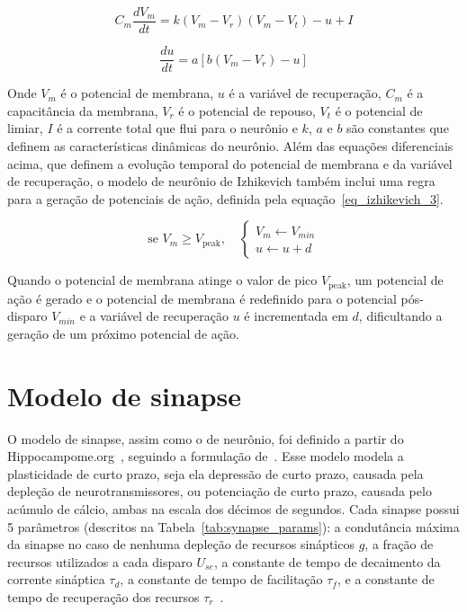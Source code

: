 
\begin{equation}
\label{eq_izhikevich_1}
C_m \frac{dV_m}{dt} = k (V_m - V_r)(V_m - V_t) - u + I
\end{equation}

\begin{equation}
\label{eq_izhikevich_2}
\frac{du}{dt} = a [b(V_m-V_r) - u]
\end{equation}

Onde $V_m$ é o potencial de membrana, $u$ é a variável de recuperação, $C_m$ é a capacitância da membrana, $V_r$ é o
potencial de repouso, $V_t$ é o potencial de limiar, $I$ é a corrente total que flui para o neurônio e $k$, $a$ e $b$ são
constantes que definem as características dinâmicas do neurônio. Além das equações diferenciais acima, que definem a evolução
temporal do potencial de membrana e da variável de recuperação, o modelo de neurônio de Izhikevich também inclui uma regra para
a geração de potenciais de ação, definida pela equação~\ref{eq_izhikevich_3}.

\begin{equation}
\label{eq_izhikevich_3}
\text{se } V_m \geq V_{\text{peak}}, \quad
\begin{cases}
V_m \gets V_{min} \\
u \gets u + d
\end{cases}
\end{equation}

Quando o potencial de membrana atinge o valor de pico $V_{\text{peak}}$, um potencial de ação é gerado e o potencial de membrana é
redefinido para o potencial pós-disparo $V_{min}$ e a variável de recuperação $u$ é incrementada em $d$, dificultando a geração de
um próximo potencial de ação.



\section{Modelo de sinapse}

O modelo de sinapse, assim como o de neurônio, foi definido a partir do Hippocampome.org~\cite{wheelerHippocampomeorg2023},
seguindo a formulação de~. Esse modelo modela a
plasticidade de curto prazo, seja ela depressão de curto prazo, causada pela depleção de neurotransmissores, ou potenciação de
curto prazo, causada pelo acúmulo de cálcio, ambas na escala dos décimos de segundos. Cada sinapse possui 5 parâmetros (descritos
na Tabela~\ref{tab:synapse_params}): a condutância máxima da sinapse no caso de nenhuma depleção de recursos sinápticos $g$, a fração de
recursos utilizados a cada disparo $U_{se}$, a constante de tempo de decaimento da corrente sináptica $\tau_d$,
a constante de tempo de facilitação $\tau_f$, e a constante de tempo de recuperação dos recursos $\tau_r$~\cite{moradiNormalized2022}.

